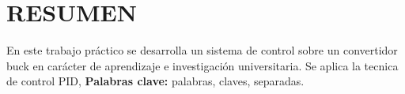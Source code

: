 \section*{\large{RESUMEN}}
\vspace{-0.35cm}
\justifying

En este trabajo práctico se desarrolla un sistema de control sobre un convertidor buck en carácter de aprendizaje e investigación universitaria.
Se aplica la tecnica de control PID, 
\vspace{-0.15cm}
\noindent \textbf{Palabras clave:} palabras, claves, separadas.